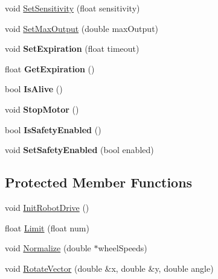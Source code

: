 \begin{DoxyCompactItemize}
\item 
void \hyperlink{classRobotDrive_ae9838cbcf783b2eeca8ace11484ce79f}{\-Set\-Sensitivity} (float sensitivity)
\item 
void \hyperlink{classRobotDrive_a6537ad67ea0306727bbf23a9b8d9b3a8}{\-Set\-Max\-Output} (double max\-Output)
\item 
\hypertarget{classRobotDrive_a6e3e5ca44b0806dec67c92abbe8cc27a}{void {\bfseries \-Set\-Expiration} (float timeout)}\label{classRobotDrive_a6e3e5ca44b0806dec67c92abbe8cc27a}

\item 
\hypertarget{classRobotDrive_a31926bfb77ba5cf767baaa5bbf350205}{float {\bfseries \-Get\-Expiration} ()}\label{classRobotDrive_a31926bfb77ba5cf767baaa5bbf350205}

\item 
\hypertarget{classRobotDrive_acd55b1b0117d425fcb73a4e8470fc5c1}{bool {\bfseries \-Is\-Alive} ()}\label{classRobotDrive_acd55b1b0117d425fcb73a4e8470fc5c1}

\item 
\hypertarget{classRobotDrive_a7768e45b579e742d21c279bf84d4613b}{void {\bfseries \-Stop\-Motor} ()}\label{classRobotDrive_a7768e45b579e742d21c279bf84d4613b}

\item 
\hypertarget{classRobotDrive_a1bcceb2e547249492ad6776b6673c7d3}{bool {\bfseries \-Is\-Safety\-Enabled} ()}\label{classRobotDrive_a1bcceb2e547249492ad6776b6673c7d3}

\item 
\hypertarget{classRobotDrive_a09817084c895e48104ff66454174c2af}{void {\bfseries \-Set\-Safety\-Enabled} (bool enabled)}\label{classRobotDrive_a09817084c895e48104ff66454174c2af}

\end{DoxyCompactItemize}
\subsection*{\-Protected \-Member \-Functions}
\begin{DoxyCompactItemize}
\item 
void \hyperlink{classRobotDrive_ae57d5bb728428fac6cbd7eade67c569d}{\-Init\-Robot\-Drive} ()
\item 
float \hyperlink{classRobotDrive_aa7d99fd794c6f8c0b5486603f508a3a7}{\-Limit} (float num)
\item 
void \hyperlink{classRobotDrive_a5e6a645728f44664ee57e5fb4c02acc7}{\-Normalize} (double $\ast$wheel\-Speeds)
\item 
void \hyperlink{classRobotDrive_af46d235e636cb5014bfbf525a2ecf247}{\-Rotate\-Vector} (double \&x, double \&y, double angle)
\end{DoxyCompactItemize}
